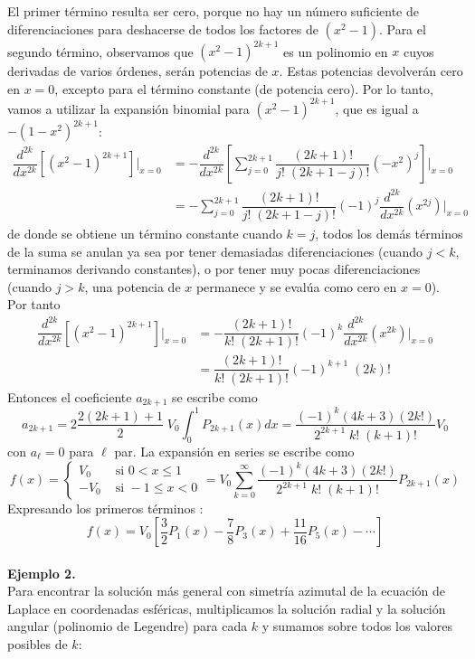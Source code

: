 El primer término resulta ser cero, porque no hay un número suficiente de diferenciaciones para deshacerse de todos los factores de $(x^{2} - 1)$. Para el segundo término, observamos que $(x^{2} - 1)^{2k + 1}$ es un polinomio en $x$ cuyos derivadas de varios órdenes, serán potencias de $x$. Estas potencias devolverán cero en $x = 0$, excepto para el término constante (de potencia cero). Por lo tanto, vamos a utilizar la expansión binomial para $(x^{2} - 1)^{2k + 1}$, que es igual a $-(1 - x^{2})^{2k + 1}$:
\[ \begin{split}
\dfrac{d^{2k}}{d x^{2k}} \left[ (x^{2} - 1)^{2k+1} \right] \Bigr\lvert_{x=0} &= - \dfrac{d^{2k}}{d x^{2k}} \left[ \sum_{j=0}^{2k+1} \dfrac{(2k+1)!}{j! \; (2k + 1 - j)!} (-x^{2})^{j} \right] \Biggr\lvert_{x=0} \\
&= - \sum_{j=0}^{2k+1} \dfrac{(2k+1)!}{j! \; (2k + 1 - j)!} (-1)^{j} \dfrac{d^{2k}}{d x^{2k}} \left( x^{2j} \right) \Biggr\vert_{x=0}
\end{split} \]
de donde se obtiene un término constante cuando $k = j$, todos los demás términos de la suma se anulan ya sea por tener  demasiadas diferenciaciones (cuando $j <k$, terminamos derivando constantes), o por tener muy pocas diferenciaciones (cuando $j> k$, una potencia de $x$ permanece y se evalúa como cero en $x = 0$). Por tanto
\[ \begin{split}
\dfrac{d^{2k}}{d x^{2k}} \left[ (x^{2} - 1)^{2k+1} \right] \Bigr\lvert_{x=0} &= - \dfrac{(2k+1)!}{k! \; (2k + 1)!} (-1)^{k} \dfrac{d^{2k}}{d x^{2k}} \left( x^{2k} \right) \Biggr\vert_{x=0} \\
&= \dfrac{(2k+1)!}{k! \; (2k + 1)!} (-1)^{k+1} \; (2k)!
\end{split} \]
Entonces el coeficiente $a_{2k+1}$ se escribe como
\[ a_{2k+1} = 2 \dfrac{2(2k+1)+1}{2} \; V_{0} \int_{0}^{1} P_{2k+1} (x) dx = \dfrac{(-1)^{k}(4k+3)(2k!)}{2^{2k+1} \; k! \; (k+1)!} V_{0} \]
con $a_{\ell} = 0$ para $\ell$ par. La expansión en series se escribe como
\[ 
f(x) = \begin{cases}
V_{0} & \mbox{ si } 0 < x \leq 1 \\
-V_{0} & \mbox{ si } -1 \leq x < 0
\end{cases}
= V_{0} \sum_{k=0}^{\infty} \dfrac{(-1)^{k}(4k+3)(2k!)}{2^{2k+1} \; k! \; (k+1)!} P_{2k+1} (x)
\] 
Expresando los primeros términos :
\[ f(x) = V_{0} \left[ \dfrac{3}{2} P_{1}(x) - \dfrac{7}{8} P_{3}(x) + \dfrac{11}{16} P_{5}(x) - \cdots \right]  \]
\\
\textbf{Ejemplo 2.}
\\
Para encontrar la solución más general con simetría azimutal de la ecuación de Laplace en coordenadas esféricas, multiplicamos la solución radial y la solución angular (polinomio de Legendre) para cada $k$ y sumamos sobre todos los valores posibles de $k$:
